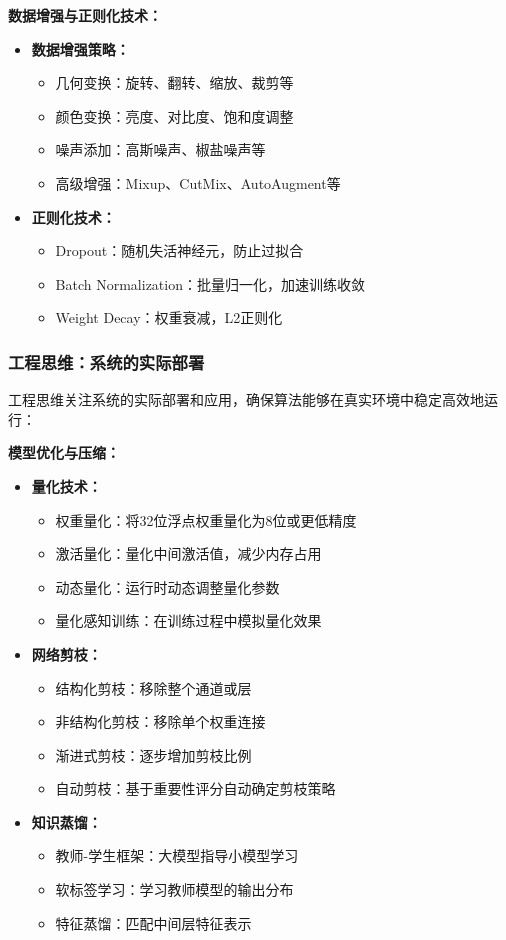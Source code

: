 \textbf{数据增强与正则化技术：}
\begin{itemize}
\item \textbf{数据增强策略：}
\begin{itemize}
\item 几何变换：旋转、翻转、缩放、裁剪等
\item 颜色变换：亮度、对比度、饱和度调整
\item 噪声添加：高斯噪声、椒盐噪声等
\item 高级增强：Mixup、CutMix、AutoAugment等
\end{itemize}
\item \textbf{正则化技术：}
\begin{itemize}
\item Dropout：随机失活神经元，防止过拟合
\item Batch Normalization：批量归一化，加速训练收敛
\item Weight Decay：权重衰减，L2正则化
\end{itemize}
\end{itemize}

\subsubsection{工程思维：系统的实际部署}

工程思维关注系统的实际部署和应用，确保算法能够在真实环境中稳定高效地运行：

\textbf{模型优化与压缩：}
\begin{itemize}
\item \textbf{量化技术：}
\begin{itemize}
\item 权重量化：将32位浮点权重量化为8位或更低精度
\item 激活量化：量化中间激活值，减少内存占用
\item 动态量化：运行时动态调整量化参数
\item 量化感知训练：在训练过程中模拟量化效果
\end{itemize}
\item \textbf{网络剪枝：}
\begin{itemize}
\item 结构化剪枝：移除整个通道或层
\item 非结构化剪枝：移除单个权重连接
\item 渐进式剪枝：逐步增加剪枝比例
\item 自动剪枝：基于重要性评分自动确定剪枝策略
\end{itemize}
\item \textbf{知识蒸馏：}
\begin{itemize}
\item 教师-学生框架：大模型指导小模型学习
\item 软标签学习：学习教师模型的输出分布
\item 特征蒸馏：匹配中间层特征表示
\end{itemize}
\end{itemize}

